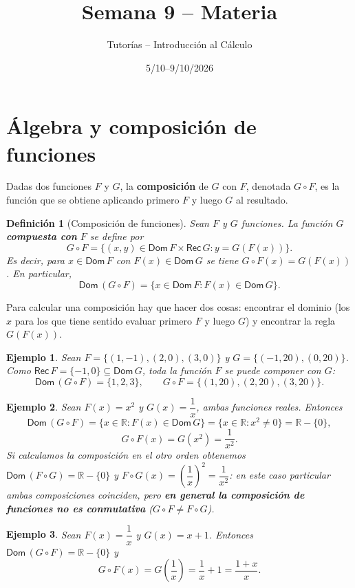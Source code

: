 \documentclass[11pt]{article}
\title{Semana 9 -- Materia}
\author{Tutorías -- Introducción al Cálculo}
\date{5/10--9/10/2026}
\newtheorem{definicion}{Definición}
\newtheorem{ejemplo}{Ejemplo}
\begin{document}
\maketitle

\section{Álgebra y composición de funciones}

Dadas dos funciones $F$ y $G$, la \textbf{composición} de $G$ con $F$, denotada $G \circ F$, es la
función que se obtiene aplicando primero $F$ y luego $G$ al resultado.

\begin{definicion}[Composición de funciones]
Sean $F$ y $G$ funciones. La función $G$ \textbf{compuesta con} $F$ se define por
$$G \circ F = \{(x,y) \in \mathsf{Dom}\,F \times \mathsf{Rec}\,G : y = G(F(x))\}.$$
Es decir, para $x \in \mathsf{Dom}\,F$ con $F(x) \in \mathsf{Dom}\,G$ se tiene $G\circ F(x) = G(F(x))$.
En particular,
$$\mathsf{Dom}\,(G\circ F) = \{x \in \mathsf{Dom}\,F : F(x) \in \mathsf{Dom}\,G\}.$$
\end{definicion}

Para calcular una composición hay que hacer dos cosas: encontrar el dominio (los $x$ para los que
tiene sentido evaluar primero $F$ y luego $G$) y encontrar la regla $G(F(x))$.

\begin{ejemplo}
Sean $F = \{(1,-1),(2,0),(3,0)\}$ y $G = \{(-1,20),(0,20)\}$. Como $\mathsf{Rec}\,F = \{-1,0\}
\subseteq \mathsf{Dom}\,G$, toda la función $F$ se puede componer con $G$:
$$\mathsf{Dom}\,(G\circ F) = \{1,2,3\}, \qquad G\circ F = \{(1,20),(2,20),(3,20)\}.$$
\end{ejemplo}

\begin{ejemplo}
Sean $F(x) = x^2$ y $G(x) = \dfrac{1}{x}$, ambas funciones reales. Entonces
$$\mathsf{Dom}\,(G\circ F) = \{x \in \mathbb{R} : F(x) \in \mathsf{Dom}\,G\} = \{x \in \mathbb{R} : x^2
\neq 0\} = \mathbb{R}-\{0\},$$
$$G\circ F(x) = G(x^2) = \frac{1}{x^2}.$$
Si calculamos la composición en el otro orden obtenemos $\mathsf{Dom}\,(F\circ G) = \mathbb{R}-\{0\}$
y $F\circ G(x) = \left(\dfrac{1}{x}\right)^2 = \dfrac{1}{x^2}$: en este caso particular ambas
composiciones coinciden, pero \textbf{en general la composición de funciones no es conmutativa}
($G\circ F \neq F \circ G$).
\end{ejemplo}

\begin{ejemplo}
Sean $F(x) = \dfrac{1}{x}$ y $G(x) = x+1$. Entonces $\mathsf{Dom}\,(G\circ F) = \mathbb{R}-\{0\}$ y
$$G\circ F(x) = G\left(\frac{1}{x}\right) = \frac{1}{x}+1 = \frac{1+x}{x}.$$
\end{ejemplo}
\end{document}
